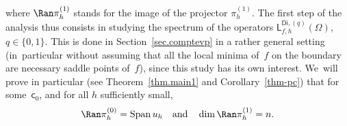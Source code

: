 \documentclass[JEP,XML,SOM,Unicode,NoEqCountersInSection,NoFloatCountersInSection,published]{cedram}
\newcommand{\quand}{\quad\text{and}\quad}
\DeclareMathOperator{\Span}{Span}
\theoremstyle{plain}
\theoremstyle{definition}
\begin{document}
where $\Ran \pi_h^{(1)}$ stands for the image of the projector $\pi_h^{(1)}$.
The first step of the analysis thus consists in studying the spectrum
of the operators $\mathsf
L^{\mathsf{Di},(q)}_{f,h}(\Omega)$, $q\in\{0,1\}$. This is done in
Section~\ref{sec.comptevp} in a rather general setting (in~particular
without assuming that all the local minima of~$f$ on the boundary are
necessary saddle points of~$f$), since this
study has its own interest. We~will prove in
particular
(see Theorem~\ref{thm.main1} and Corollary~\ref{thm-pc}) that for
some~$\mathsf
c_0$, and for all $h$ sufficiently small,\vspace*{-3pt}
\begin{equation}\label{eq.dim-no}
\Ran \pi_h^{(0)} = \Span u_h \quand \dim \Ran \pi_h^{(1)} =n.
\end{equation}
\end{document}
